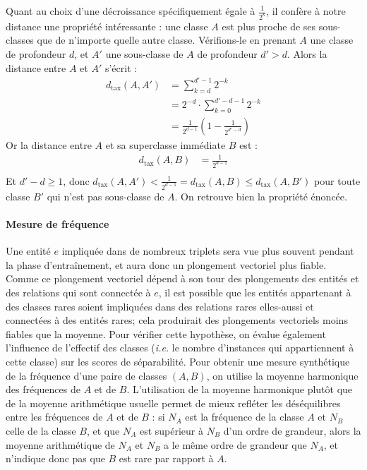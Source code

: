 Quant au choix d'une décroissance spécifiquement égale à $\frac{1}{2^k}$, il confère à notre distance une propriété intéressante : une classe $A$ est plus proche de ses sous-classes que de n'importe quelle autre classe. Vérifions-le en prenant $A$ une classe de profondeur $d$, et $A'$ une sous-classe de $A$ de profondeur $d' > d$. Alors la distance entre $A$ et $A'$ s'écrit :
\begin{align*}
    d_\text{tax}(A, A') &= \sum_{k = d}^{d'-1} 2^{-k} \\
    &= 2^{-d} \cdot \sum_{k=0}^{d'-d-1} 2^{-k} \\
    &= \frac{1}{2^{d-1}} \left(1 - \frac{1}{2^{d'-d}} \right) 
\end{align*}
Or la distance entre $A$ et sa superclasse immédiate $B$ est :
\begin{align*}
    d_\text{tax}(A, B) &= \frac{1}{2^{d-1}} \\
\end{align*}
Et $d'-d \geq 1$, donc $d_\text{tax}(A, A') < \frac{1}{2^{d-1}} = d_\text{tax}(A, B) \leq d_\text{tax}(A, B')$ pour toute classe $B'$ qui n'est pas sous-classe de $A$. On retrouve bien la propriété énoncée.



\paragraph{Mesure de fréquence}

Une entité $e$ impliquée dans de nombreux triplets sera vue plus souvent pendant la phase d'entraînement, et aura donc un plongement vectoriel plus fiable. Comme ce plongement vectoriel dépend à son tour des plongements des entités et des relations qui sont connectée à $e$, il est possible que les entités appartenant à des classes rares soient impliquées dans des relations rares elles-aussi et connectées à des entités rares; cela produirait des plongements vectoriels moins fiables que la moyenne. Pour vérifier cette hypothèse, on évalue également l'influence de l'effectif des classes (\textit{i.e.} le nombre d'instances qui appartiennent à cette classe) sur les scores de séparabilité. Pour obtenir une mesure synthétique de la fréquence d'une paire de classes $(A, B)$, on utilise la moyenne harmonique des fréquences de $A$ et de $B$. L'utilisation de la moyenne harmonique plutôt que de la moyenne arithmétique usuelle permet de mieux refléter les déséquilibres entre les fréquences de $A$ et de $B$ : si $N_A$ est la fréquence de la classe $A$ et $N_B$ celle de la classe $B$, et que $N_A$ est supérieur à $N_B$ d'un ordre de grandeur, alors la moyenne arithmétique de $N_A$ et $N_B$ a le même ordre de grandeur que $N_A$, et n'indique donc pas que $B$ est rare par rapport à $A$.


